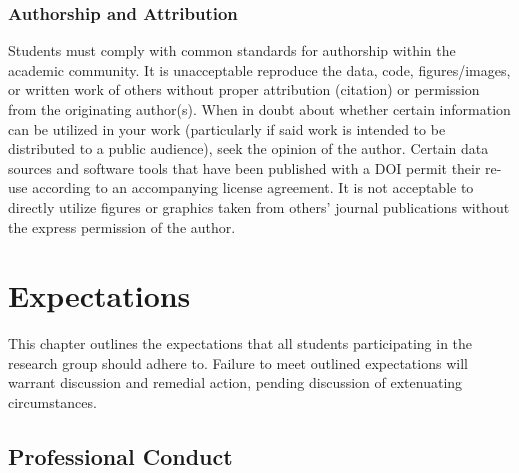 \documentclass[12pt,a4paper,article,oneside]{memoir} %
\begin{document}
\subsection{Authorship and Attribution}

Students must comply with common standards for authorship within the academic community. It is unacceptable reproduce the data, code, figures/images, or written work of others without proper attribution (citation) or permission from the originating author(s). When in doubt about whether certain information can be utilized in your work (particularly if said work is intended to be distributed to a public audience), seek the opinion of the author. Certain data sources and software tools that have been published with a DOI permit their re-use according to an accompanying license agreement. It is not acceptable to directly utilize figures or graphics taken from others' journal publications without the express permission of the author.


\newpage

\chapter{Expectations} \label{sec:expectations}

This chapter outlines the expectations that all students participating in the research group should adhere to. Failure to meet outlined expectations will warrant discussion and remedial action, pending discussion of extenuating circumstances.




\section{Professional Conduct}
\end{document}
